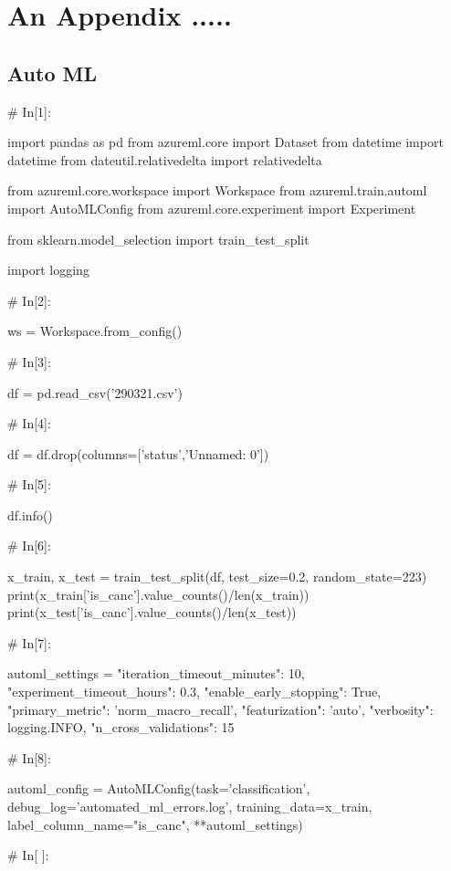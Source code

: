 \chapter{An Appendix .....}
\label{appn:A}

\section{Auto ML}

\begin{python}
# In[1]:


import pandas as pd
from azureml.core import Dataset
from datetime import datetime
from dateutil.relativedelta import relativedelta

from azureml.core.workspace import Workspace
from azureml.train.automl import AutoMLConfig
from azureml.core.experiment import Experiment

from sklearn.model_selection import train_test_split

import logging


# In[2]:


ws = Workspace.from_config()


# In[3]:


df = pd.read_csv('290321.csv')


# In[4]:


df = df.drop(columns=['status','Unnamed: 0'])


# In[5]:


df.info()


# In[6]:


x_train, x_test = train_test_split(df, test_size=0.2, random_state=223)
print(x_train['is_canc'].value_counts()/len(x_train))
print(x_test['is_canc'].value_counts()/len(x_test))


# In[7]:


automl_settings = {
    "iteration_timeout_minutes": 10,
    "experiment_timeout_hours": 0.3,
    "enable_early_stopping": True,
    "primary_metric": 'norm_macro_recall',
    "featurization": 'auto',
    "verbosity": logging.INFO,
    "n_cross_validations": 15
}


# In[8]:


automl_config = AutoMLConfig(task='classification',
                             debug_log='automated_ml_errors.log',
                             training_data=x_train,
                             label_column_name="is_canc",
                             **automl_settings)


# In[ ]:



\end{python}
